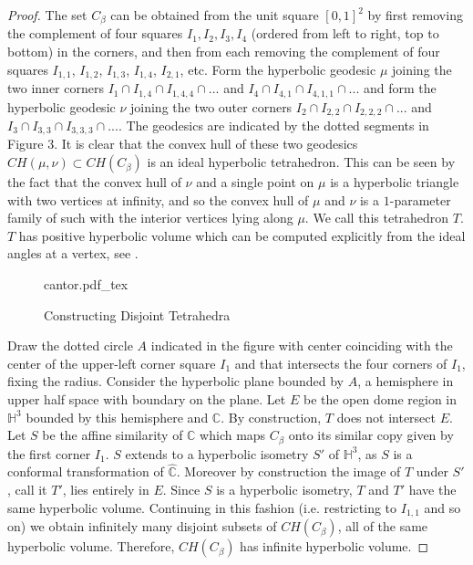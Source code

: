 \documentclass[11pt]{article}
\newcommand{\incfig}[1]{%
    \def\svgwidth{.6\textwidth}
    {#1.pdf_tex}
}
\newcommand\comp{{\mathbb{C}}}
\begin{document}
\begin{proof} The set $C_\beta$ can be obtained from the unit square $[0,1]^2$ by first removing the complement of four squares $I_1, I_2, I_3, I_4$ (ordered from left to right, top to bottom) in the corners, and then from each removing the complement of four squares $I_{1,1}$, $I_{1,2}$, $I_{1,3}$, $I_{1,4}$, $I_{2,1}$, etc. Form the hyperbolic geodesic $\mu$ joining the two inner corners $I_1 \cap I_{1,4} \cap I_{1, 4, 4} \cap ...$ and $I_4 \cap  I_{4,1} \cap I_{4,1,1} \cap ...$ and form the hyperbolic geodesic $\nu$ joining the two outer corners $I_{2} \cap I_{2, 2} \cap I_{2,2,2} \cap...$ and $I_{3} \cap I_{3,3} \cap I_{3,3,3} \cap...$. The geodesics are indicated by the dotted segments in Figure 3. It is clear that the convex hull of these two geodesics $CH(\mu, \nu) \subset CH(C_\beta)$ is an ideal hyperbolic tetrahedron. This can be seen by the fact that the convex hull of $\nu$ and a single point on $\mu$ is a hyperbolic triangle with two vertices at infinity, and so the convex hull of $\mu$ and $\nu$ is a $1$-parameter family of such with the interior vertices lying along $\mu$. We call this tetrahedron $T$. $T$ has positive hyperbolic volume which can be computed explicitly from the ideal angles at a vertex, see \cite{miln}. 

\bigskip

 \begin{figure}[ht]
    \centering
    \incfig{cantor}
    \caption{Constructing Disjoint Tetrahedra}
    \label{fig:circles}
\end{figure}

Draw the dotted circle $A$ indicated in the figure with center coinciding with the center of the upper-left corner square $I_1$ and that intersects the four corners of $I_1$, fixing the radius. Consider the hyperbolic plane bounded by $A$, a hemisphere in upper half space with boundary on the plane. Let $E$ be the open dome region in $\mathbb{H}^3$ bounded by this hemisphere and $\comp$.  By construction, $T$ does not intersect $E$. Let $S$ be the affine similarity of $\comp$ which maps $C_\beta$ onto its similar copy given by the first corner $I_1$. $S$ extends to a hyperbolic isometry $S'$ of $\mathbb{H}^3$, as $S$ is a conformal transformation of $\hat{\comp}$. Moreover by construction the image of $T$ under $S'$, call it $T'$, lies entirely in $E$. Since $S$ is a hyperbolic isometry, $T$ and $T'$ have the same hyperbolic volume. Continuing in this fashion (i.e. restricting to $I_{1,1}$ and so on) we obtain infinitely many disjoint subsets of $CH(C_\beta)$, all of the same hyperbolic volume. Therefore, $CH(C_\beta)$ has infinite hyperbolic volume.
\end{proof}
\end{document}
